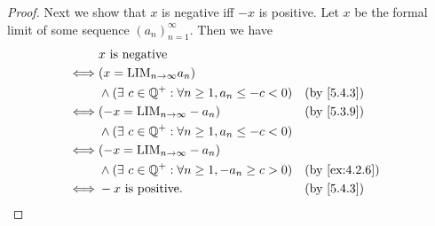 \begin{proof}
  Next we show that \(x\) is negative iff \(-x\) is positive.
  Let \(x\) be the formal limit of some sequence \((a_n)_{n = 1}^{\infty}\).
  Then we have
  \begin{align*}
         & x \text{ is negative}                                                                            \\
    \iff & (x = \text{LIM}_{n \to \infty} a_n)                                                              \\
         & \land (\exists\ c \in \Q^+ : \forall n \geq 1, a_n \leq -c < 0) &  & \text{(by \cref{5.4.3})}    \\
    \iff & (-x = \text{LIM}_{n \to \infty} -a_n)                           &  & \text{(by \cref{5.3.9})}    \\
         & \land (\exists\ c \in \Q^+ : \forall n \geq 1, a_n \leq -c < 0)                                  \\
    \iff & (-x = \text{LIM}_{n \to \infty} -a_n)                                                            \\
         & \land (\exists\ c \in \Q^+ : \forall n \geq 1, -a_n \geq c > 0) &  & \text{(by \cref{ex:4.2.6})} \\
    \iff & -x \text{ is positive}.                                         &  & \text{(by \cref{5.4.3})}
  \end{align*}


\end{proof}
